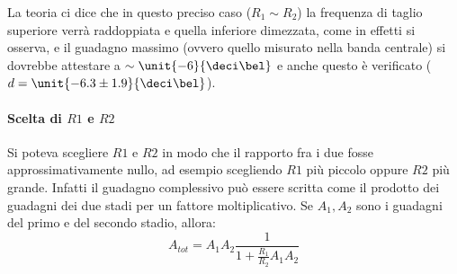 \documentclass[10pt,a4paper]{article}
\begin{document}
La teoria ci dice che in questo preciso caso ($R_1 \sim R_2$) la frequenza di taglio superiore verrà raddoppiata e quella inferiore dimezzata, come in effetti si osserva, e il guadagno massimo (ovvero quello misurato nella banda centrale) si dovrebbe attestare a $\sim \unit{-6}{\deci\bel}$ e anche questo è verificato ($d=\unit{-6.3 \pm 1.9}{\deci\bel}$).

\paragraph{Scelta di $R1$ e $R2$} Si poteva scegliere $R1$ e $R2$ in modo che il rapporto fra i due fosse approssimativamente nullo, ad esempio scegliendo $R1$ più piccolo oppure $R2$ più grande.
Infatti il guadagno complessivo può essere scritta come il prodotto dei guadagni dei due stadi per un fattore moltiplicativo. Se $A_1, A_2$ sono i guadagni del primo e del secondo stadio, allora:
\begin{equation*}
A_{tot} = A_1 A_2 \frac{1}{1 + \frac{R_1}{R_2} A_1 A_2}
\end{equation*}
\end{document}
